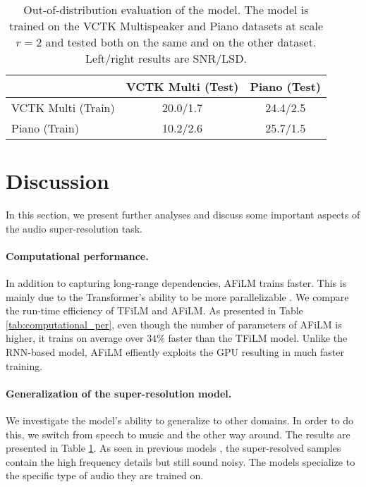 \documentclass{article}
\begin{document}
\begin{table}[h]
\centering
\caption{Out-of-distribution evaluation of the model. The model is trained on the VCTK Multispeaker and Piano datasets at scale $r=2$ and tested both on the same and on the other dataset. Left/right results are SNR/LSD.}
\label{tab:out_of_distribution}
\begin{tabular}{l|c|c|}
\cline{2-3}
\multicolumn{1}{l|}{}                    & \multicolumn{1}{c|}{VCTK Multi (Test)} & \multicolumn{1}{c|}{Piano (Test)} \\ \hline
\multicolumn{1}{|l|}{VCTK Multi (Train)} & 20.0/1.7                               & 24.4/2.5                          \\ \hline
\multicolumn{1}{|l|}{Piano (Train)}      & 10.2/2.6                               & 25.7/1.5                          \\ \hline
\end{tabular}
\end{table}

\section{Discussion}
In this section, we present further analyses and discuss some important aspects of the audio super-resolution task.

\paragraph*{Computational performance.} In addition to capturing long-range dependencies, AFiLM trains faster. This is mainly due to the Transformer's ability to be more parallelizable \cite{vaswani2017attention}. We compare the run-time efficiency of TFiLM and AFiLM. As presented in Table \ref{tab:computational_per}, even though the number of parameters of AFiLM is higher, it trains on average over $34\%$ faster than the TFiLM model. Unlike the RNN-based model, AFiLM effiently exploits the GPU resulting in much faster training.

\paragraph*{Generalization of the super-resolution model.} We investigate the model's ability to generalize to other domains. In order to do this, we switch from speech to music and the other way around. The results are presented in Table \ref{tab:out_of_distribution}. As seen in previous models \cite{kuleshov2017audio,birnbaum2019temporal}, the super-resolved samples contain the high frequency details but still sound noisy. The models specialize to the specific type of audio they are trained on. 
\end{document}
